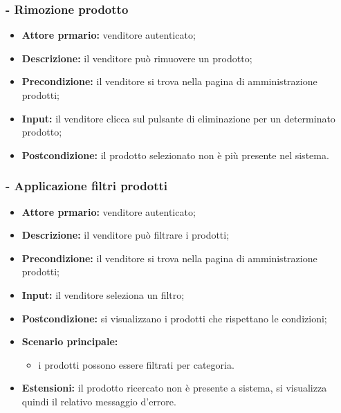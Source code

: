 \stepsubUserCase
\subsubsection{- Rimozione prodotto}
\begin{itemize}
    \item \textbf{Attore prmario:} venditore autenticato;
    \item \textbf{Descrizione:} il venditore può rimuovere un prodotto;
    \item \textbf{Precondizione:} il venditore si trova nella pagina di amministrazione prodotti;
    \item \textbf{Input:} il venditore clicca sul pulsante di eliminazione per un determinato prodotto;
    \item \textbf{Postcondizione:} il prodotto selezionato non è più presente nel sistema.
\end{itemize}

\stepsubUserCase
\subsubsection{- Applicazione filtri prodotti}
\begin{itemize}
    \item \textbf{Attore prmario:} venditore autenticato;
    \item \textbf{Descrizione:} il venditore può filtrare i prodotti;
    \item \textbf{Precondizione:} il venditore si trova nella pagina di amministrazione prodotti;
    \item \textbf{Input:} il venditore seleziona un filtro;
    \item \textbf{Postcondizione:} si visualizzano i prodotti che rispettano le condizioni;
    \item \textbf{Scenario principale:}
    \begin{itemize}
        \item i prodotti possono essere filtrati per categoria.
    \end{itemize}
    \item \textbf{Estensioni:} il prodotto ricercato non è presente a sistema, si visualizza quindi il relativo messaggio d'errore.
\end{itemize}

\stepsubUserCase
